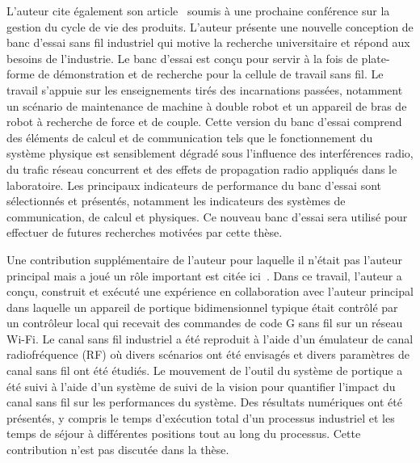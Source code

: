 \documentclass[12pt]{article}
\begin{document}
		L'auteur cite également son article~\cite{Candell.PLMConf2020} soumis à une prochaine conférence sur la gestion du cycle de vie des produits. L'auteur présente une nouvelle conception de banc d'essai sans fil industriel qui motive la recherche universitaire et répond aux besoins de l'industrie. Le banc d'essai est conçu pour servir à la fois de plate-forme de démonstration et de recherche pour la cellule de travail sans fil. Le travail s'appuie sur les enseignements tirés des incarnations passées, notamment un scénario de maintenance de machine à double robot et un appareil de bras de robot à recherche de force et de couple. Cette version du banc d'essai comprend des éléments de calcul et de communication tels que le fonctionnement du système physique est sensiblement dégradé sous l'influence des interférences radio, du trafic réseau concurrent et des effets de propagation radio appliqués dans le laboratoire. Les principaux indicateurs de performance du banc d'essai sont sélectionnés et présentés, notamment les indicateurs des systèmes de communication, de calcul et physiques. Ce nouveau banc d'essai sera utilisé pour effectuer de futures recherches motivées par cette thèse.
		
		Une contribution supplémentaire de l'auteur pour laquelle il n'était pas l'auteur principal mais a joué un rôle important est citée ici~\cite{MSEC2019-2896}.  Dans ce travail, l'auteur a conçu, construit et exécuté une expérience en collaboration avec l'auteur principal dans laquelle un appareil de portique bidimensionnel typique était contrôlé par un contrôleur local qui recevait des commandes de code G sans fil sur un réseau Wi-Fi. Le canal sans fil industriel a été reproduit à l'aide d'un émulateur de canal radiofréquence (RF) où divers scénarios ont été envisagés et divers paramètres de canal sans fil ont été étudiés. Le mouvement de l'outil du système de portique a été suivi à l'aide d'un système de suivi de la vision pour quantifier l'impact du canal sans fil sur les performances du système. Des résultats numériques ont été présentés, y compris le temps d'exécution total d'un processus industriel et les temps de séjour à différentes positions tout au long du processus. Cette contribution n'est pas discutée dans la thèse.


%		
%		
%		
		
\end{document}
